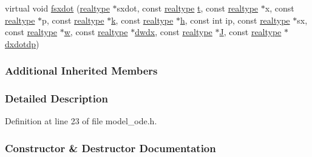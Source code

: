 \begin{DoxyCompactItemize}
\item 
virtual void \mbox{\hyperlink{classamici_1_1_model___o_d_e_afd49b292aecf540d4d751756647ada6e}{fsxdot}} (\mbox{\hyperlink{namespaceamici_a1bdce28051d6a53868f7ccbf5f2c14a3}{realtype}} $\ast$sxdot, const \mbox{\hyperlink{namespaceamici_a1bdce28051d6a53868f7ccbf5f2c14a3}{realtype}} \mbox{\hyperlink{classamici_1_1_model_a711281d57e9710226face29151cc4641}{t}}, const \mbox{\hyperlink{namespaceamici_a1bdce28051d6a53868f7ccbf5f2c14a3}{realtype}} $\ast$x, const \mbox{\hyperlink{namespaceamici_a1bdce28051d6a53868f7ccbf5f2c14a3}{realtype}} $\ast$p, const \mbox{\hyperlink{namespaceamici_a1bdce28051d6a53868f7ccbf5f2c14a3}{realtype}} $\ast$\mbox{\hyperlink{classamici_1_1_model_adde50e0d8a99d20354c8403bf93fab6f}{k}}, const \mbox{\hyperlink{namespaceamici_a1bdce28051d6a53868f7ccbf5f2c14a3}{realtype}} $\ast$\mbox{\hyperlink{classamici_1_1_model_a0e4df9c10406b35bd54f6f839322ca87}{h}}, const int ip, const \mbox{\hyperlink{namespaceamici_a1bdce28051d6a53868f7ccbf5f2c14a3}{realtype}} $\ast$sx, const \mbox{\hyperlink{namespaceamici_a1bdce28051d6a53868f7ccbf5f2c14a3}{realtype}} $\ast$\mbox{\hyperlink{classamici_1_1_model_a6b305431617db7966c726f756e819843}{w}}, const \mbox{\hyperlink{namespaceamici_a1bdce28051d6a53868f7ccbf5f2c14a3}{realtype}} $\ast$\mbox{\hyperlink{classamici_1_1_model_a58b93c923b4fd9c0322c969954696210}{dwdx}}, const \mbox{\hyperlink{namespaceamici_a1bdce28051d6a53868f7ccbf5f2c14a3}{realtype}} $\ast$\mbox{\hyperlink{classamici_1_1_model_a71cc1d93543998249a172328e1a4dbcd}{J}}, const \mbox{\hyperlink{namespaceamici_a1bdce28051d6a53868f7ccbf5f2c14a3}{realtype}} $\ast$\mbox{\hyperlink{classamici_1_1_model_adba071f2419937047304600d4dad9b04}{dxdotdp}})
\end{DoxyCompactItemize}
\subsubsection*{Additional Inherited Members}


\subsubsection{Detailed Description}


Definition at line 23 of file model\+\_\+ode.\+h.



\subsubsection{Constructor \& Destructor Documentation}
\mbox{\label{classamici_1_1_model___o_d_e_ac1e4d80aa9b64e27e48c740d27b1d907}} 
